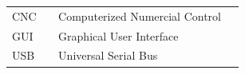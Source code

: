 \documentclass[11pt,a4paper,bibtotoc,oneside]{scrbook}
\begin{document}

%
%

%

\hspace{-17mm}\begin{tabular}{>{\raggedleft}p{0.2\linewidth} p{0.75\linewidth} p{0.1\linewidth}}
CNC  & Computerized Numercial Control \\
GUI  & Graphical User Interface \\
USB  & Universal Serial Bus \\

\end{tabular}

%
%
%
\end{document}
